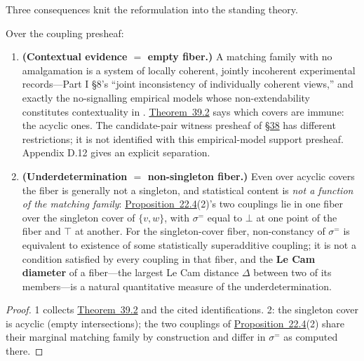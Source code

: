 Three consequences knit the reformulation into the standing theory.

\begin{thmplain}

Over the coupling presheaf:

\begin{enumerate}
\def\labelenumi{\arabic{enumi}.}
\tightlist
\item
  \textbf{(Contextual evidence \(=\) empty fiber.)} A matching family with no amalgamation is a system of locally coherent, jointly incoherent experimental records---\hspace{0pt}Part I §8's ``joint inconsistency of individually coherent views,'' and exactly the no-signalling empirical models whose non-extendability constitutes contextuality in \autocite{abramsky2011}. \hyperlink{stmt:39.2}{Theorem~39.2} says which covers are immune: the acyclic ones. The candidate-pair witness presheaf of \hyperlink{sec:38}{§38} has different restrictions; it is not identified with this empirical-model support presheaf. Appendix D.12 gives an explicit separation.
\item
  \textbf{(Underdetermination \(=\) non-singleton fiber.)} Even over acyclic covers the fiber is generally not a singleton, and statistical content is \emph{not a function of the matching family}: \hyperlink{stmt:22.4}{Proposition~22.4}(2)'s two couplings lie in one fiber over the singleton cover of \(\{v, w\}\), with \(\sigma^{=}\) equal to \(\bot\) at one point of the fiber and \(\top\) at another. For the singleton-cover fiber, non-constancy of \(\sigma^{=}\) is equivalent to existence of some statistically superadditive coupling; it is not a condition satisfied by every coupling in that fiber, and the \textbf{Le Cam diameter} of a fiber---\hspace{0pt}the largest Le Cam distance \(\Delta\) between two of its members---\hspace{0pt}is a natural quantitative measure of the underdetermination.
\end{enumerate}
\end{thmplain}

\begin{proof}

1 collects \hyperlink{stmt:39.2}{Theorem~39.2} and the cited identifications. 2: the singleton cover is acyclic (empty intersections); the two couplings of \hyperlink{stmt:22.4}{Proposition~22.4}(2) share their marginal matching family by construction and differ in \(\sigma^{=}\) as computed there.
\end{proof}

